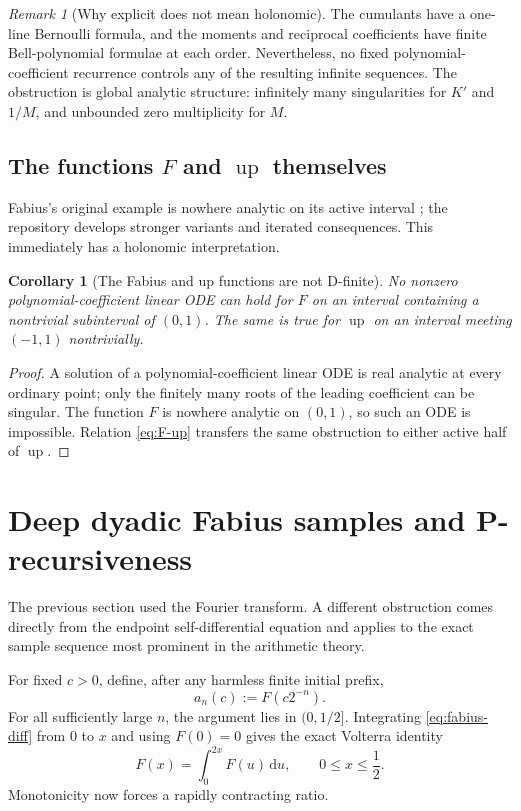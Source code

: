\documentclass[11pt]{article}
\numberwithin{equation}{section}
\newtheorem{corollary}[theorem]{Corollary}
\theoremstyle{definition}
\theoremstyle{remark}
\newtheorem{remark}[theorem]{Remark}
\newcommand{\dd}{\,\mathrm d}
\newcommand{\upf}{\operatorname{up}}
\begin{document}
\begin{remark}[Why explicit does not mean holonomic]
The cumulants have a one-line Bernoulli formula, and the moments and reciprocal
coefficients have finite Bell-polynomial formulae at each order.  Nevertheless,
no fixed polynomial-coefficient recurrence controls any of the resulting
infinite sequences.  The obstruction is global analytic structure: infinitely
many singularities for $K'$ and $1/M$, and unbounded zero multiplicity for
$M$.
\end{remark}

\subsection{The functions \texorpdfstring{$F$ and $\upf$}{F and up} themselves}

Fabius's original example is nowhere analytic on its active interval
\cite{Fabius}; the repository develops stronger variants and iterated
consequences.  This immediately has a holonomic interpretation.

\begin{corollary}[The Fabius and up functions are not D-finite]
\label{cor:F-up-not-Dfinite}
No nonzero polynomial-coefficient linear ODE can hold for $F$ on an interval
containing a nontrivial subinterval of $(0,1)$.  The same is true for $\upf$ on
an interval meeting $(-1,1)$ nontrivially.
\end{corollary}
\begin{proof}
A solution of a polynomial-coefficient linear ODE is real analytic at every
ordinary point; only the finitely many roots of the leading coefficient can be
singular.  The function $F$ is nowhere analytic on $(0,1)$, so such an ODE is
impossible.  Relation \eqref{eq:F-up} transfers the same obstruction to either
active half of $\upf$.
\end{proof}

\section{Deep dyadic Fabius samples and P-recursiveness}
\label{sec:deep-samples}

The previous section used the Fourier transform.  A different obstruction comes
directly from the endpoint self-differential equation and applies to the exact
sample sequence most prominent in the arithmetic theory.

For fixed $c>0$, define, after any harmless finite initial prefix,
\begin{equation}
 a_n(c):=F(c2^{-n}).
 \label{eq:deep-sample}
\end{equation}
For all sufficiently large $n$, the argument lies in $(0,1/2]$.  Integrating
\eqref{eq:fabius-diff} from $0$ to $x$ and using $F(0)=0$ gives the exact
Volterra identity
\begin{equation}
 F(x)=\int_0^{2x}F(u)\dd u,
 \qquad 0\le x\le\frac12.
 \label{eq:F-Volterra}
\end{equation}
Monotonicity now forces a rapidly contracting ratio.
\end{document}
